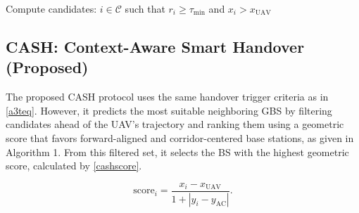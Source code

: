 \documentclass[10pt,conference]{IEEEtran}
\begin{document}
\begin{algorithm}[!t]
\small
\caption{CASH: Context-Aware Smart Handover}


Compute candidates: $i \in \mathcal{C}$ such that $r_i \geq \tau_{\min}$ and $x_i > x_{\text{UAV}}$\;


\end{algorithm}




\subsection{CASH: Context-Aware Smart Handover (Proposed)}
The proposed CASH protocol uses the same handover trigger criteria as in \eqref{a3teq}. However, it predicts the most suitable neighboring GBS by filtering candidates ahead of the UAV’s trajectory and ranking them using a geometric score that favors forward-aligned and corridor-centered base stations, as given in Algorithm 1. From this filtered set, it selects the BS with the highest geometric score, calculated by \eqref{cashscore}.

\begin{equation}
\label{cashscore}
\text{score}_i = \frac{x_i - x_{\text{UAV}}}{1 + |y_i - y_{\text{AC}}|}.
\end{equation}
\end{document}
